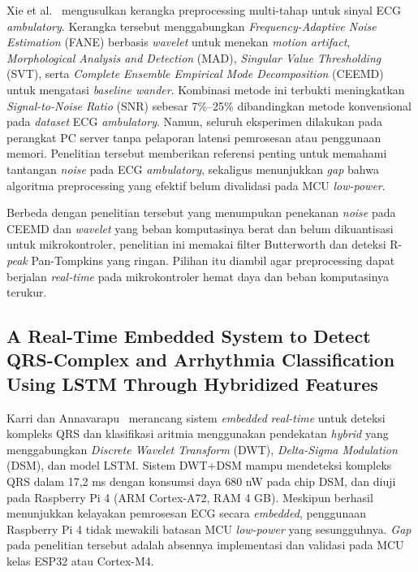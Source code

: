 Xie et al.~\cite{xie_2021} mengusulkan kerangka preprocessing multi-tahap untuk sinyal ECG \textit{ambulatory}. Kerangka tersebut menggabungkan \textit{Frequency-Adaptive Noise Estimation} (FANE) berbasis \textit{wavelet} untuk menekan \textit{motion artifact}, \textit{Morphological Analysis and Detection} (MAD), \textit{Singular Value Thresholding} (SVT), serta \textit{Complete Ensemble Empirical Mode Decomposition} (CEEMD) untuk mengatasi \textit{baseline wander}. Kombinasi metode ini terbukti meningkatkan \textit{Signal-to-Noise Ratio} (SNR) sebesar 7\%--25\% dibandingkan metode konvensional pada \textit{dataset} ECG \textit{ambulatory}. Namun, seluruh eksperimen dilakukan pada perangkat PC server tanpa pelaporan latensi pemrosesan atau penggunaan memori. Penelitian tersebut memberikan referensi penting untuk memahami tantangan \textit{noise} pada ECG \textit{ambulatory}, sekaligus menunjukkan \textit{gap} bahwa algoritma preprocessing yang efektif belum divalidasi pada MCU \textit{low-power}.

Berbeda dengan penelitian tersebut yang menumpukan penekanan \textit{noise} pada CEEMD dan \textit{wavelet} yang beban komputasinya berat dan belum dikuantisasi untuk mikrokontroler, penelitian ini memakai filter Butterworth dan deteksi R-\textit{peak} Pan-Tompkins yang ringan. Pilihan itu diambil agar preprocessing dapat berjalan \textit{real-time} pada mikrokontroler hemat daya dan beban komputasinya terukur.

\subsection{A Real-Time Embedded System to Detect QRS-Complex and Arrhythmia Classification Using LSTM Through Hybridized Features}

Karri dan Annavarapu~\cite{karri_2023} merancang sistem \textit{embedded} \textit{real-time} untuk deteksi kompleks QRS dan klasifikasi aritmia menggunakan pendekatan \textit{hybrid} yang menggabungkan \textit{Discrete Wavelet Transform} (DWT), \textit{Delta-Sigma Modulation} (DSM), dan model LSTM. Sistem DWT+DSM mampu mendeteksi kompleks QRS dalam 17,2 ms dengan konsumsi daya 680 nW pada chip DSM, dan diuji pada Raspberry Pi 4 (ARM Cortex-A72, RAM 4 GB). Meskipun berhasil menunjukkan kelayakan pemrosesan ECG secara \textit{embedded}, penggunaan Raspberry Pi 4 tidak mewakili batasan MCU \textit{low-power} yang sesungguhnya. \textit{Gap} pada penelitian tersebut adalah absennya implementasi dan validasi pada MCU kelas ESP32 atau Cortex-M4.

